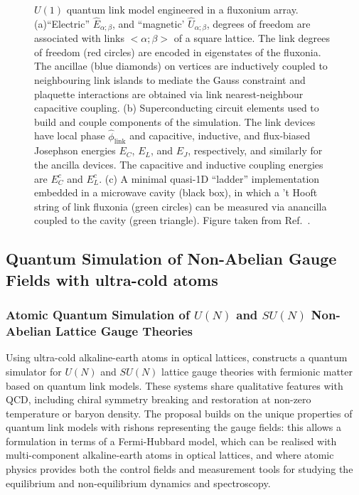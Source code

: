 \documentclass[epj,final]{svjour}
\begin{document}
\begin{figure}
\caption{$U(1)$ quantum link model engineered in a fluxonium array. (a)``Electric'' $\hat{E}_{\alpha;\beta}$, and ``magnetic'  $\hat{U}_{\alpha;\beta}$, degrees of freedom are associated with links $<\alpha ; \beta>$ of a square lattice. The link degrees of freedom (red circles) are encoded in eigenstates of the fluxonia. The ancillae (blue diamonds) on vertices are inductively coupled to neighbouring link islands to mediate the Gauss constraint and plaquette interactions are obtained via link nearest-neighbour capacitive coupling. (b) Superconducting circuit elements used to build and couple components of the simulation. The link devices have local phase $\hat{\phi}_{\text{link}}$ and capacitive, inductive, and flux-biased Josephson energies $E_{C}$, $E_{L}$, and $E_{J}$, respectively, and similarly for the ancilla devices. The capacitive and inductive coupling energies are $E^{c}_{C}$ and $E^{c}_{L}$. (c) A minimal quasi-1D ``ladder'' implementation embedded in a microwave cavity (black box), in which a 't Hooft string of link fluxonia (green circles) can be measured via anancilla coupled to the cavity (green triangle). Figure taken from Ref.~\cite{brennen2016loops}.}
\end{figure} 

\subsection{Quantum Simulation of Non-Abelian Gauge Fields with ultra-cold atoms}

\subsubsection{Atomic Quantum Simulation of $U(N)$ and $SU(N)$ Non-Abelian Lattice Gauge Theories\cite{banerjee2013atomic}}

Using ultra-cold alkaline-earth atoms in optical lattices, \cite{banerjee2013atomic} constructs a quantum simulator for $U(N)$ and $SU(N)$ lattice gauge theories with fermionic matter based on quantum link models. These systems share qualitative features with QCD, including chiral symmetry breaking and restoration at non-zero temperature or baryon density. The proposal builds on the unique properties of quantum link models with rishons representing the gauge fields: this allows a formulation in terms of a Fermi-Hubbard model, which can be realised with multi-component alkaline-earth atoms in optical lattices, and where atomic physics provides both the control fields and measurement tools for studying the equilibrium and non-equilibrium dynamics and spectroscopy. 
\end{document}

